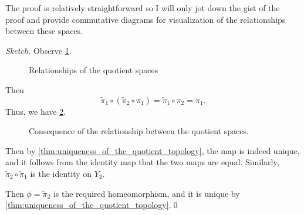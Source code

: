 \documentclass[notoc,notitlepage]{tufte-book}
\begin{document}
The proof is relatively straightforward so I will only jot down the gist of the proof and provide
commutative diagrams for visualization of the relationships between these spaces.

\begin{proof}[Sketch]
  Observe \cref{fig:relationships_of_the_quotient_spaces}.
  \begin{figure}[ht]
    \centering
    \caption{Relationships of the quotient spaces}
    \label{fig:relationships_of_the_quotient_spaces}
  \end{figure}

  Then
  \begin{equation*}
    \tilde{\pi}_1 \circ (\tilde{\pi}_2 \circ \pi_1) = \tilde{\pi}_1 \circ \pi_2 = \pi_1.
  \end{equation*}
  Thus, we have \cref{fig:consequence_of_the_relationship_between_the_quotient_spaces_}.
  \begin{figure}[ht]
    \centering
    \caption{Consequence of the relationship between the quotient spaces.}
    \label{fig:consequence_of_the_relationship_between_the_quotient_spaces_}
  \end{figure}

  Then by \cref{thm:uniqueness_of_the_quotient_topology}, the map is indeed unique, and it
  follows from the identity map that the two maps are equal. Similarly, $\tilde{\pi}_2 \circ
  \tilde{\pi}_1$ is the identity on $Y_2$.

  Then $\phi = \tilde{\pi}_2$ is the required homeomorphism, and it is unique by
  \cref{thm:uniqueness_of_the_quotient_topology}.\qed\
\end{proof}




\appendix

\backmatter

\pagestyle{plain}

\nobibliography*


\printindex
\end{document}
